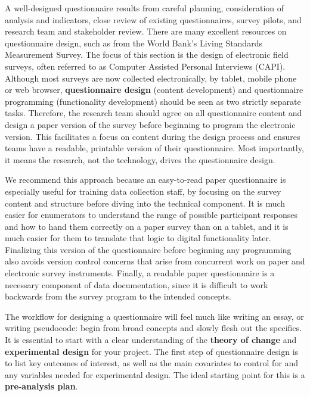 A well-designed questionnaire results from careful planning,
consideration of analysis and indicators, close review of existing questionnaires,
survey pilots, and research team and stakeholder review.
There are many excellent resources on questionnaire design,
such as from the World Bank's Living Standards Measurement Survey.\cite{glewwe2000designing}
The focus of this section is the design of electronic field surveys,
often referred to as Computer Assisted Personal Interviews (CAPI).
Although most surveys are now collected electronically, by tablet, mobile phone or web browser,
\textbf{questionnaire design}
(content development) and questionnaire programming (functionality development)
should be seen as two strictly separate tasks.
Therefore, the research team should agree on all questionnaire content
and design a paper version of the survey before beginning to program the electronic version.
This facilitates a focus on content during the design process
and ensures teams have a readable, printable version of their questionnaire.
Most importantly, it means the research, not the technology, drives the questionnaire design.

We recommend this approach because an easy-to-read paper questionnaire
is especially useful for training data collection staff,
by focusing on the survey content and structure before diving into the technical component.
It is much easier for enumerators to understand the range of possible participant responses
and how to hand them correctly on a paper survey than on a tablet,
and it is much easier for them to translate that logic to digital functionality later.
Finalizing this version of the questionnaire before beginning any programming
also avoids version control concerns that arise from concurrent work
on paper and electronic survey instruments.
Finally, a readable paper questionnaire is a necessary component of data documentation,
since it is difficult to work backwards from the survey program to the intended concepts.

The workflow for designing a questionnaire will feel much like writing an essay, or writing pseudocode:
begin from broad concepts and slowly flesh out the specifics.
It is essential to start with a clear understanding of the
\textbf{theory of change}
and \textbf{experimental design} for your project.
The first step of questionnaire design is to list key outcomes of interest,
as well as the main covariates to control for and any variables needed for experimental design.
The ideal starting point for this is a \textbf{pre-analysis plan}.

